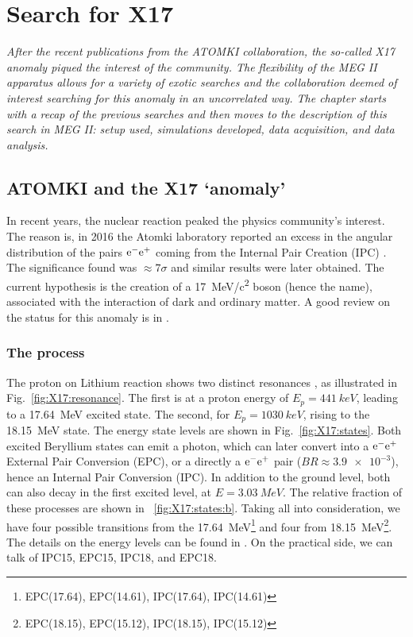 \chapter{Search for X17}
\begin{refsection}
\label{ch:X17}
{\itshape After the recent publications from the ATOMKI collaboration, the so-called X17 anomaly piqued the interest of the community. The flexibility of the MEG II apparatus allows for a variety of exotic searches and the collaboration deemed of interest searching for this anomaly in an uncorrelated way.
The chapter starts with a recap of the previous searches and then moves to the description of this search in MEG II: setup used, simulations developed, data acquisition, and data analysis.}

\section{ATOMKI and the X17 `anomaly'}
    In recent years, the nuclear reaction  peaked the physics community's interest.
    The reason is, in 2016 the Atomki laboratory reported an excess in the angular distribution of the pairs $\text{e}^- \text{e}^+$ coming from the Internal Pair Creation (IPC) \cite{X17:results:2017}.
    The significance found was $\approx7\sigma$ and similar results were later obtained.
    The current hypothesis is the creation of a \SI{17}{MeV/c^2} boson (hence the name), associated with the interaction of dark and ordinary matter.
    A good review on the status for this anomaly is in \cite{X17:2023}.
    
    \subsection{The process}
        The proton on Lithium reaction shows two distinct resonances \cite{X17:crossections}, as illustrated in Fig.~\ref{fig:X17:resonance}.
        The first is at a proton energy of $E_p=\SI{441}{keV}$, leading to a \SI{17.64}{MeV} excited state.
        The second, for $E_p=\SI{1030}{keV}$, rising to the \SI{18.15}{MeV} state.
        The energy state levels are shown in Fig.~\ref{fig:X17:states}.
        Both excited Beryllium states can emit a photon, which can later convert into a $\text{e}^-\text{e}^+$ External Pair Conversion (EPC), or a directly a $\text{e}^-\text{e}^+$ pair ($BR\approx\num{3.9e-3}$), hence an Internal Pair Conversion (IPC).
        In addition to the ground level, both can also decay in the first excited level, at $E=\SI{3.03}{MeV}$.
        The relative fraction of these processes are shown in ~\ref{fig:X17:states:b}.
        Taking all into consideration, we have four possible transitions from the \SI{17.64}{MeV}\footnote{EPC(17.64), EPC(14.61), IPC(17.64), IPC(14.61)} and four from \SI{18.15}{MeV}\footnote{EPC(18.15), EPC(15.12), IPC(18.15), IPC(15.12)}. 
        The details on the energy levels can be found in \cite{X17:Elevels:2004}.
        On the practical side, we can talk of IPC15, EPC15, IPC18, and EPC18.
        

\end{refsection}
